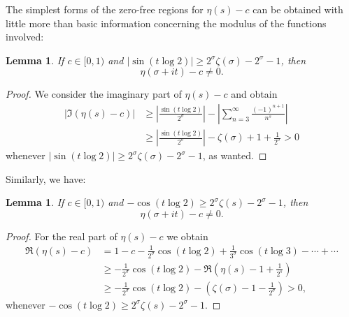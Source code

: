 \documentclass{amsart}
\theoremstyle{plain}
\newtheorem{lemma}[theorem]{Lemma}
\theoremstyle{definition}
\begin{document}
The simplest forms of the zero-free regions for $\eta(s)-c$ can be obtained with little more than basic information concerning the modulus of the functions involved:


\begin{lemma}
    If $c\in[0,1)$ and $|\sin(t\log 2)|\geq 2^\sigma \zeta(\sigma)-2^\sigma - 1$, then 
    $$\eta(\sigma +it)-c \ne 0. $$
\end{lemma}

\begin{proof}
    We consider the imaginary part of $\eta(s)-c$ and obtain
    \begin{align*}
        |\Im(\eta(s)-c)|&\geq \left|\frac{\sin(t\log 2)}{2^\sigma} \right|-
        \left|\sum_{n=3}^\infty \frac{(-1)^{n+1}}{n^s}\right|\\
        &\geq \left|\frac{\sin(t\log 2)}{2^\sigma} \right|-\zeta(\sigma)+1+\frac{1}{2^\sigma} 
             > 0
    \end{align*}
   whenever $|\sin(t\log 2)|\geq 2^\sigma \zeta(\sigma) -2^\sigma-1$, as wanted.
\end{proof}
Similarly, we have:
\begin{lemma}
    If $c\in[0,1)$ and $-\cos(t \log 2 ) \geq 2^\sigma\zeta(s) -2^\sigma-1$, then 
    $$\eta(\sigma +it)-c \ne 0. $$
\end{lemma}
\begin{proof}
    For the real part of $\eta(s)-c$ we obtain
    \begin{align*}
        \Re(\eta(s)-c) 
        &= 1-c-\frac{1}{2^\sigma}\cos(t \log 2) +\frac{1}{3^\sigma}\cos(t \log 3)-\cdots+\cdots\\
        &\geq -\frac{1}{2^\sigma}\cos(t\log2) -\Re\left(\eta(s) -1 + \frac{1}{2^s
        }\right) \\
        &\geq -\frac{1}{2^\sigma}\cos(t \log 2) -\left(\zeta(\sigma)-1-\frac{1}{2^\sigma}\right) > 0,
    \end{align*}
 whenever $ -\cos(t \log 2) \geq 2^\sigma\zeta(s) -2^\sigma-1$. 
\end{proof}
\end{document}
